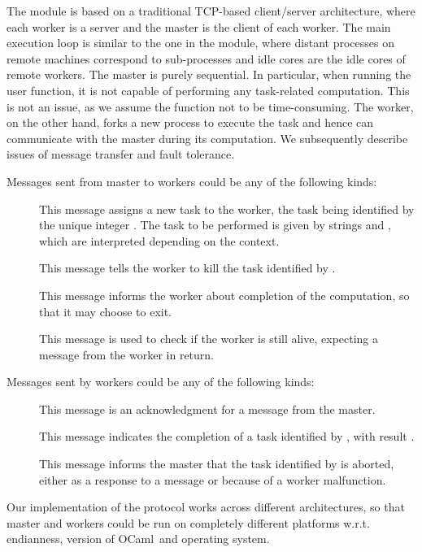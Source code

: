\documentclass[tfpsymp,pagenumbers]{tfp07symp}
\newcommand{\Ocaml}{OCaml}
\begin{document}
The  module is based on a traditional TCP-based client/server
architecture, where each worker is a server and the master is the
client of each worker. The main execution loop is similar to the one
in the  module, where distant processes on remote machines
correspond to sub-processes and idle cores are the idle cores 
of remote workers. 
The master is purely sequential. In particular, when running the user
 function, it is not capable of performing any task-related
computation. This is not an issue, as we assume the 
function not to be time-consuming.
The worker, on the other hand, forks a new process to execute the task
and hence can communicate with the master during its computation.
We subsequently describe issues of message
transfer and fault tolerance.


Messages sent from master to workers could be any of the following kinds:
\begin{description}
\item[] This message assigns a
  new task to the worker, the task being identified by the unique
  integer . The task to be performed is given by strings 
  and , which are interpreted depending on the context.

\item[] This message tells the worker to kill the task
  identified by .

\item[] This message informs the worker about completion of
  the computation, so that it may choose to exit.

\item[] This message is used to check if the worker is still
  alive, expecting a  message from the worker in return.
\end{description}
Messages sent by workers could be any of the following kinds:
\begin{description}
\item[] This message is an acknowledgment for a 
  message from the master.

\item[] This message indicates the
  completion of a task identified by , with result .

\item[] This message informs the master that the
  task identified by  is aborted, either as a response to a
   message or because of a worker malfunction.
\end{description}
Our implementation of the protocol works across different
architectures, so that master and workers could be run on completely
different platforms w.r.t. endianness, version of \Ocaml\ and
operating system.
\end{document}
